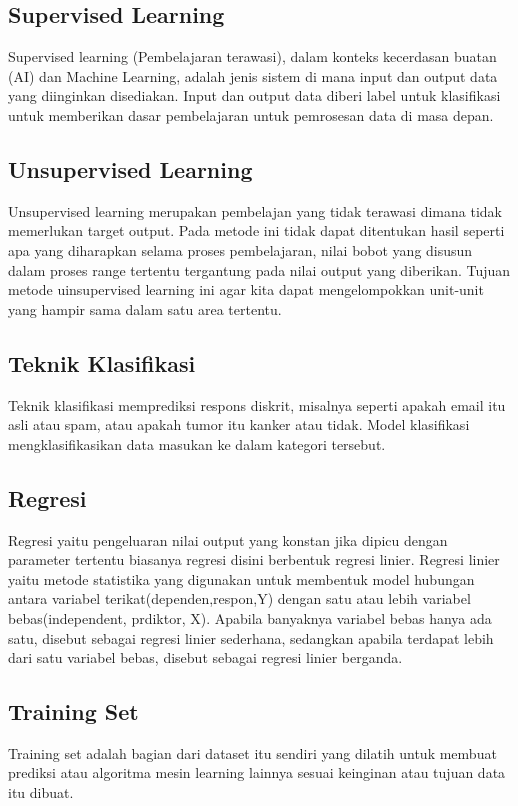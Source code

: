 	\subsection{Supervised Learning}
	Supervised learning (Pembelajaran terawasi), dalam konteks kecerdasan buatan (AI) dan Machine Learning, adalah jenis sistem di mana input dan output data yang diinginkan disediakan. Input dan output data diberi label untuk klasifikasi untuk memberikan dasar pembelajaran untuk pemrosesan data di masa depan.
	
	\subsection{Unsupervised Learning}
	Unsupervised learning merupakan pembelajan yang tidak terawasi dimana tidak memerlukan target output. Pada metode ini tidak dapat ditentukan hasil seperti apa yang diharapkan selama proses pembelajaran, nilai bobot yang disusun dalam proses range tertentu tergantung pada nilai output yang diberikan. Tujuan metode uinsupervised learning ini agar kita dapat mengelompokkan unit-unit yang hampir sama dalam satu area tertentu.
	
	\subsection{Teknik Klasifikasi}
	Teknik klasifikasi memprediksi respons diskrit, misalnya seperti apakah email itu asli atau spam, atau apakah tumor itu kanker atau tidak. Model klasifikasi mengklasifikasikan data masukan ke dalam kategori tersebut.
	
	\subsection{Regresi}
	Regresi yaitu pengeluaran nilai output yang konstan jika dipicu dengan parameter tertentu biasanya regresi disini berbentuk regresi linier. Regresi linier yaitu metode statistika yang digunakan untuk membentuk model hubungan antara variabel terikat(dependen,respon,Y) dengan satu atau lebih variabel bebas(independent, prdiktor, X). Apabila banyaknya variabel bebas hanya ada satu, disebut sebagai regresi linier sederhana, sedangkan apabila terdapat lebih dari satu variabel bebas, disebut sebagai regresi linier berganda.
	
	\subsection{Training Set}
	Training set adalah bagian dari dataset itu sendiri yang dilatih untuk membuat prediksi atau algoritma mesin learning lainnya sesuai keinginan atau tujuan data itu dibuat.
	
